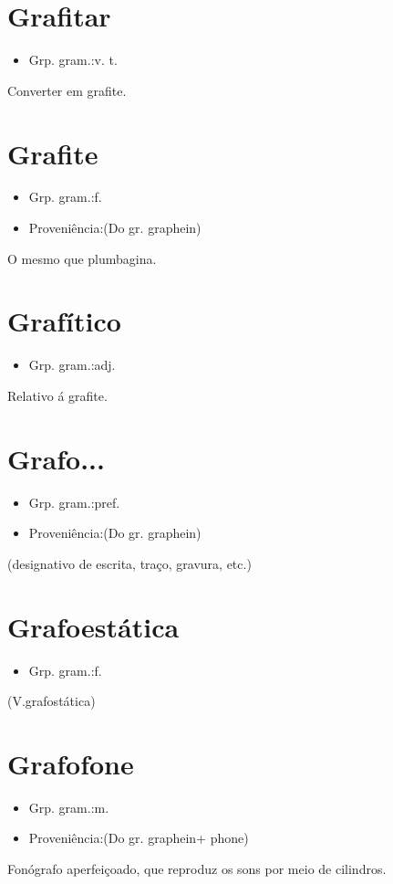 \section{Grafitar}
\begin{itemize}
\item {Grp. gram.:v. t.}
\end{itemize}
Converter em grafite.
\section{Grafite}
\begin{itemize}
\item {Grp. gram.:f.}
\end{itemize}
\begin{itemize}
\item {Proveniência:(Do gr. \textunderscore graphein\textunderscore )}
\end{itemize}
O mesmo que \textunderscore plumbagina\textunderscore .
\section{Grafítico}
\begin{itemize}
\item {Grp. gram.:adj.}
\end{itemize}
Relativo á grafite.
\section{Grafo...}
\begin{itemize}
\item {Grp. gram.:pref.}
\end{itemize}
\begin{itemize}
\item {Proveniência:(Do gr. \textunderscore graphein\textunderscore )}
\end{itemize}
(designativo de escrita, traço, gravura, etc.)
\section{Grafoestática}
\begin{itemize}
\item {Grp. gram.:f.}
\end{itemize}
(V.grafostática)
\section{Grafofone}
\begin{itemize}
\item {Grp. gram.:m.}
\end{itemize}
\begin{itemize}
\item {Proveniência:(Do gr. \textunderscore graphein\textunderscore  + \textunderscore phone\textunderscore )}
\end{itemize}
Fonógrafo aperfeiçoado, que reproduz os sons por meio de cilindros.
